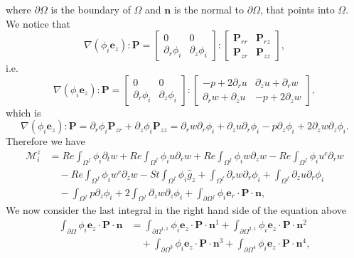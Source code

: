 \documentclass{article}
\begin{document}
where $\partial \Omega$ is the boundary of $\Omega$ and $\mathbf{n}$ is the normal to $\partial \Omega$, that points into $\Omega$.
We notice that
\begin{equation}
\nabla (\phi_i \mathbf{e}_z) : \mathbf{P} = \begin{bmatrix} 0 & 0 \\ \partial_r \phi_i & \partial_z \phi_i \end{bmatrix} : \begin{bmatrix} \mathbf{P}_{rr} & \mathbf{P}_{rz} \\ \mathbf{P}_{zr} & \mathbf{P}_{zz} \end{bmatrix}, \tag{5.6}
\end{equation}
i.e.
\begin{equation}
\nabla (\phi_i \mathbf{e}_z) : \mathbf{P} = \begin{bmatrix} 0 & 0 \\ \partial_r \phi_i & \partial_z \phi_i \end{bmatrix} : \begin{bmatrix} -p + 2\partial_r u & \partial_z u + \partial_r w \\ \partial_r w + \partial_z u & -p + 2\partial_z w \end{bmatrix}, \tag{5.7}
\end{equation}
which is
\begin{equation}
\nabla (\phi_i \mathbf{e}_z) : \mathbf{P} = \partial_r \phi_i \mathbf{P}_{zr} + \partial_z \phi_i \mathbf{P}_{zz} = \partial_r w \partial_r \phi_i + \partial_z u \partial_r \phi_i - p \partial_z \phi_i + 2 \partial_z w \partial_z \phi_i. \tag{5.8}
\end{equation}
Therefore we have
\begin{align}
\mathcal{M}_i^z &= Re \int_{\Omega^f} \phi_i \partial_t w + Re \int_{\Omega^f} \phi_i u \partial_r w + Re \int_{\Omega^f} \phi_i w \partial_z w - Re \int_{\Omega^f} \phi_i u^c \partial_r w \nonumber\\
&\quad - Re \int_{\Omega^f} \phi_i w^c \partial_z w - St \int_{\Omega^f} \phi_i \hat{g}_z + \int_{\Omega^f} \partial_r w \partial_r \phi_i + \int_{\Omega^f} \partial_z u \partial_r \phi_i \nonumber\\
&\quad - \int_{\Omega^f} p \partial_z \phi_i + 2 \int_{\Omega^f} \partial_z w \partial_z \phi_i + \int_{\partial \Omega^f} \phi_i \mathbf{e}_r \cdot \mathbf{P} \cdot \mathbf{n}, \tag{5.9}
\end{align}
We now consider the last integral in the right hand side of the equation above
\begin{align}
\int_{\partial \Omega} \phi_i \mathbf{e}_z \cdot \mathbf{P} \cdot \mathbf{n} &= \int_{\partial \Omega^{1,1}} \phi_i \mathbf{e}_z \cdot \mathbf{P} \cdot \mathbf{n}^1 + \int_{\partial \Omega^{2,1}} \phi_i \mathbf{e}_z \cdot \mathbf{P} \cdot \mathbf{n}^2 \nonumber\\
&\quad + \int_{\partial \Omega^{3}} \phi_i \mathbf{e}_z \cdot \mathbf{P} \cdot \mathbf{n}^3 + \int_{\partial \Omega^{4}} \phi_i \mathbf{e}_z \cdot \mathbf{P} \cdot \mathbf{n}^4, \tag{5.10}
\end{align}
\end{document}
